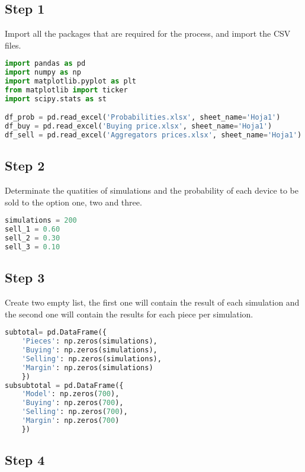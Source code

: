\documentclass[11pt,a4paper,twocolumn]{article}
\begin{document}
\subsection{Step 1}

Import all the packages that are required for the process, and import the CSV files.

\begin{lstlisting}[language=python]
import pandas as pd
import numpy as np
import matplotlib.pyplot as plt
from matplotlib import ticker
import scipy.stats as st

df_prob = pd.read_excel('Probabilities.xlsx', sheet_name='Hoja1')
df_buy = pd.read_excel('Buying price.xlsx', sheet_name='Hoja1')
df_sell = pd.read_excel('Aggregators prices.xlsx', sheet_name='Hoja1')

\end{lstlisting}

\subsection{Step 2}

Determinate the quatities of simulations and the probability of each device to be sold to the option one, two and three.

\begin{lstlisting}[language=python]
simulations = 200
sell_1 = 0.60
sell_2 = 0.30
sell_3 = 0.10
\end{lstlisting}

\subsection{Step 3}

Create two empty list, the first one will contain the result of each simulation and the second one will contain the results for each piece per simulation.

\begin{lstlisting}[language=python]
subtotal= pd.DataFrame({
    'Pieces': np.zeros(simulations),
    'Buying': np.zeros(simulations),
    'Selling': np.zeros(simulations),
    'Margin': np.zeros(simulations)
    })
subsubtotal = pd.DataFrame({
    'Model': np.zeros(700),
    'Buying': np.zeros(700),
    'Selling': np.zeros(700),
    'Margin': np.zeros(700)
    })
\end{lstlisting}

\subsection{Step 4}
\end{document}
